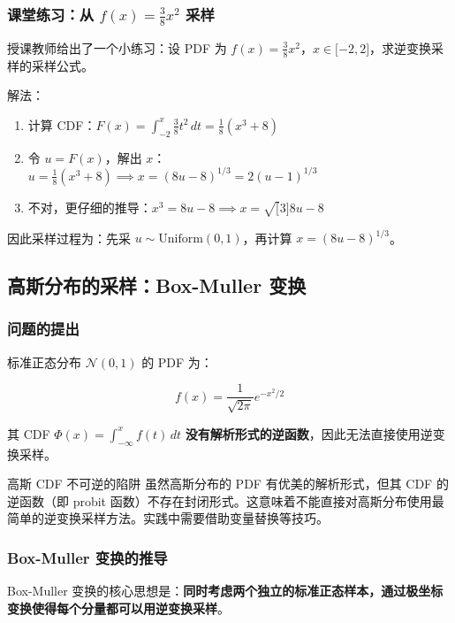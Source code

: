 \documentclass[a4paper]{article}
\begin{document}
\subsubsection{课堂练习：从 $f(x) = \frac{3}{8}x^2$ 采样}

授课教师给出了一个小练习：设 PDF 为 $f(x) = \frac{3}{8}x^2$，$x \in {[}-2, 2{]}$，求逆变换采样的采样公式。

解法：
\begin{enumerate}
    \item 计算 CDF：$F(x) = \int_{-2}^{x} \frac{3}{8}t^2 \, dt = \frac{1}{8}(x^3 + 8)$
    \item 令 $u = F(x)$，解出 $x$：$u = \frac{1}{8}(x^3 + 8) \implies x = (8u - 8)^{1/3} = 2(u-1)^{1/3}$
    \item 不对，更仔细的推导：$x^3 = 8u - 8 \implies x = \sqrt{[}3{]}{8u - 8}$
\end{enumerate}

因此采样过程为：先采 $u \sim \text{Uniform}(0,1)$，再计算 $x = (8u - 8)^{1/3}$。

\subsection{高斯分布的采样：Box-Muller 变换}

\subsubsection{问题的提出}

标准正态分布 $\mathcal{N}(0, 1)$ 的 PDF 为：

$$f(x) = \frac{1}{\sqrt{2\pi}} e^{-x^2/2}$$

其 CDF $\Phi(x) = \int_{-\infty}^{x} f(t) \, dt$ \textbf{没有解析形式的逆函数}，因此无法直接使用逆变换采样。

\begin{warningbox}{高斯 CDF 不可逆的陷阱}
虽然高斯分布的 PDF 有优美的解析形式，但其 CDF 的逆函数（即 probit 函数）不存在封闭形式。这意味着不能直接对高斯分布使用最简单的逆变换采样方法。实践中需要借助变量替换等技巧。
\end{warningbox}

\subsubsection{Box-Muller 变换的推导}

Box-Muller 变换的核心思想是：\textbf{同时考虑两个独立的标准正态样本，通过极坐标变换使得每个分量都可以用逆变换采样}。
\end{document}

